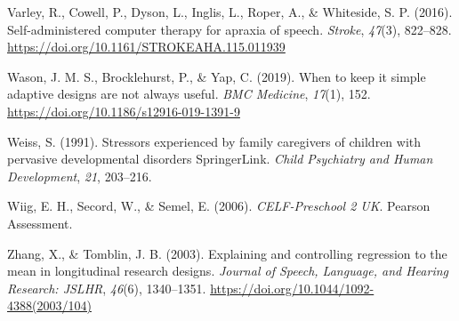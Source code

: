\documentclass{krantz}
\newlength{\cslhangindent}
\newlength{\cslentryspacingunit} %
\newenvironment{CSLReferences}[2] %
{%
\setlength{\parindent}{0pt}
\ifodd #1
\let\oldpar\par
\def\par{\hangindent=\cslhangindent\oldpar}
\fi
\setlength{\parskip}{#2\cslentryspacingunit}
}%
{}
\begin{document}
\begin{CSLReferences}{1}{0}
\leavevmode{}%
Varley, R., Cowell, P., Dyson, L., Inglis, L., Roper, A., \& Whiteside, S. P. (2016). Self-administered computer therapy for apraxia of speech. \emph{Stroke}, \emph{47}(3), 822--828. \url{https://doi.org/10.1161/STROKEAHA.115.011939}

\leavevmode{}%
Wason, J. M. S., Brocklehurst, P., \& Yap, C. (2019). When to keep it simple \textendash{} adaptive designs are not always useful. \emph{BMC Medicine}, \emph{17}(1), 152. \url{https://doi.org/10.1186/s12916-019-1391-9}

\leavevmode{}%
Weiss, S. (1991). Stressors experienced by family caregivers of children with pervasive developmental disorders \textbar{} {SpringerLink}. \emph{Child Psychiatry and Human Development}, \emph{21}, 203--216.

\leavevmode{}%
Wiig, E. H., Secord, W., \& Semel, E. (2006). \emph{{CELF-Preschool} 2 {UK}}. {Pearson Assessment}.

\leavevmode{}%
Zhang, X., \& Tomblin, J. B. (2003). Explaining and controlling regression to the mean in longitudinal research designs. \emph{Journal of Speech, Language, and Hearing Research: JSLHR}, \emph{46}(6), 1340--1351. \url{https://doi.org/10.1044/1092-4388(2003/104)}

\end{CSLReferences}
\end{document}
